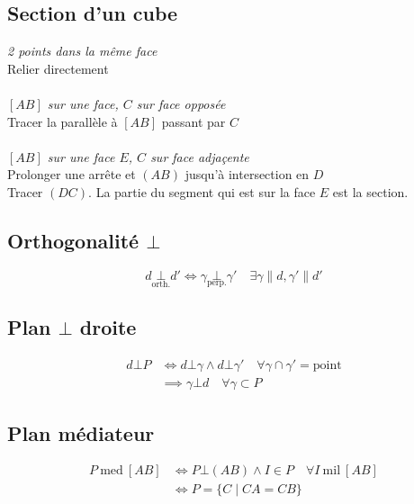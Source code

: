 \documentclass{article}
\newcommand{\mediateur}{\:\text{med}\:}
\newcommand{\milieu}{\:\text{mil}\:}
\begin{document}
\subsection{Section d'un cube}

\textit{2 points dans la même face}\\
Relier directement\\\\
\textit{$[AB]$ sur une face, $C$ sur face opposée} \\
Tracer la parallèle à $[AB]$ passant par $C$\\\\
\textit{$[AB]$ sur une face $E$, $C$ sur face adjaçente}\\
Prolonger une arrête et $(AB)$ jusqu'à intersection en $D$\\
Tracer $(DC)$. La partie du segment qui est sur la face $E$ est la section.

\subsection{Orthogonalité $\bot$}

\[d \underset{\text{orth.}}{\bot} d' \iff \gamma \underset{\text{perp.}}{\bot} \gamma' \quad\exists \gamma \parallel d, \gamma' \parallel d'\]

\subsection{Plan $\bot$ droite}

\begin{equation*}
    \begin{split}
        d \bot P &\iff d \bot \gamma \land d \bot \gamma' \quad \forall \gamma \cap \gamma' = \text{point} \\
                 &\implies \gamma \bot d \quad\forall \gamma \subset P
    \end{split}
\end{equation*}

\subsection{Plan médiateur}

\begin{equation*}
    \begin{split}
        P \mediateur [AB] &\iff P \bot (AB) \land I \in P \quad\forall I \milieu [AB]\\
                          &\iff P = \{ C \;|\; CA = CB \}
    \end{split}
\end{equation*}
\end{document}
